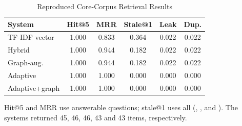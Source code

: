 \begin{table}[t]
\caption{Reproduced Core-Corpus Retrieval Results}
\label{tab:core}
\centering
\footnotesize
\setlength{\tabcolsep}{3pt}
\begin{tabular}{@{}lccccc@{}}
\toprule
\textbf{System} & \textbf{Hit@5} & \textbf{MRR} & \textbf{Stale@1} & \textbf{Leak} & \textbf{Dup.} \\
\midrule
TF-IDF vector & 1.000 & 0.833 & 0.364 & 0.022 & 0.022 \\
Hybrid & 1.000 & 0.944 & 0.182 & 0.022 & 0.022 \\
Graph-aug. & 1.000 & 0.944 & 0.182 & 0.022 & 0.022 \\
Adaptive & 1.000 & 1.000 & 0.000 & 0.000 & 0.000 \\
Adaptive+graph & 1.000 & 1.000 & 0.000 & 0.000 & 0.000 \\
\bottomrule
\end{tabular}
\par\vspace{2pt}
\raggedright\scriptsize Hit@5 and MRR use \CorpusAnswerable{} answerable questions; stale@1 uses all \CorpusQuestions{} (\CoreVanillaStaleCount, \CoreHybridStaleCount, \CoreGraphStaleCount and \CoreAdaptiveStaleCount). The systems returned 45, 46, 46, 43 and 43 items, respectively.
\end{table}
